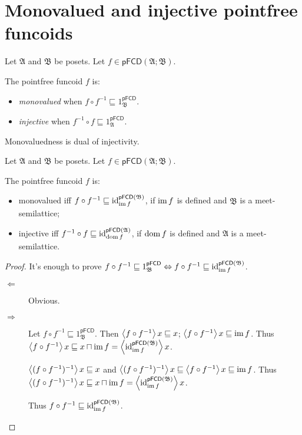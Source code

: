 \section{Monovalued and injective pointfree funcoids}
\begin{defn}
Let $\mathfrak{A}$ and $\mathfrak{B}$ be posets. Let $f\in\mathsf{pFCD}(\mathfrak{A};\mathfrak{B})$.

The pointfree funcoid $f$ is:
\begin{itemize}
\item {}\emph{monovalued} when $f\circ f^{-1}\sqsubseteq1_{\mathfrak{B}}^{\mathsf{pFCD}}$.
\item {}\emph{injective} when $f^{-1}\circ f\sqsubseteq1_{\mathfrak{A}}^{\mathsf{pFCD}}$.
\end{itemize}
\end{defn}
Monovaluedness is dual of injectivity.
\begin{prop}
Let $\mathfrak{A}$ and $\mathfrak{B}$ be posets. Let $f\in\mathsf{pFCD}(\mathfrak{A};\mathfrak{B})$.

The pointfree funcoid $f$ is:
\begin{itemize}
\item monovalued iff $f\circ f^{-1}\sqsubseteq\operatorname{id}_{\operatorname{im} f}^{\mathsf{pFCD}(\mathfrak{B})}$,
if $\operatorname{im} f$ is defined and $\mathfrak{B}$ is a meet-semilattice;
\item injective iff $f^{-1}\circ f\sqsubseteq\operatorname{id}_{\operatorname{dom} f}^{\mathsf{pFCD}(\mathfrak{A})}$,
if $\operatorname{dom} f$ is defined and $\mathfrak{A}$ is a meet-semilattice. 
\end{itemize}
\end{prop}
\begin{proof}
It's enough to prove $f\circ f^{-1}\sqsubseteq1_{\mathfrak{B}}^{\mathsf{pFCD}}\Leftrightarrow f\circ f^{-1}\sqsubseteq\operatorname{id}_{\operatorname{im} f}^{\mathsf{pFCD}(\mathfrak{B})}$.
\begin{description}
\item [{$\Leftarrow$}] Obvious.
\item [{$\Rightarrow$}] Let $f\circ f^{-1}\sqsubseteq1_{\mathfrak{B}}^{\mathsf{pFCD}}$.
Then $\left\langle f\circ f^{-1}\right\rangle x\sqsubseteq x$; $\left\langle f\circ f^{-1}\right\rangle x\sqsubseteq\operatorname{im} f$.
Thus $\left\langle f\circ f^{-1}\right\rangle x\sqsubseteq x\sqcap\operatorname{im} f=\left\langle \operatorname{id}_{\operatorname{im} f}^{\mathsf{pFCD}(\mathfrak{B})}\right\rangle x$.


$\left\langle (f\circ f^{-1})^{-1}\right\rangle x\sqsubseteq x$ and $\left\langle (f\circ f^{-1})^{-1}\right\rangle x\sqsubseteq\left\langle f\circ f^{-1}\right\rangle x\sqsubseteq\operatorname{im} f$.
Thus $\left\langle (f\circ f^{-1})^{-1}\right\rangle x\sqsubseteq x\sqcap\operatorname{im} f=\left\langle \operatorname{id}_{\operatorname{im} f}^{\mathsf{pFCD}(\mathfrak{B})}\right\rangle x$.


Thus $f\circ f^{-1}\sqsubseteq\operatorname{id}_{\operatorname{im} f}^{\mathsf{pFCD}(\mathfrak{B})}$.

\end{description}
\end{proof}
